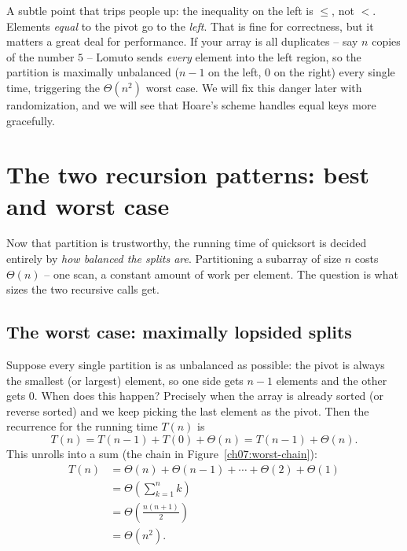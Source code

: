 \begin{trapbox}
A subtle point that trips people up: the inequality on the left is $\le$, not
$<$. Elements \emph{equal} to the pivot go to the \emph{left}. That is fine for
correctness, but it matters a great deal for performance. If your array is all
duplicates -- say $n$ copies of the number $5$ -- Lomuto sends \emph{every}
element into the left region, so the partition is maximally unbalanced ($n-1$ on
the left, $0$ on the right) every single time, triggering the $\Theta(n^2)$ worst case.
We will fix this danger later with randomization, and we will see that
Hoare's scheme handles equal keys more gracefully.
\end{trapbox}

\section{The two recursion patterns: best and worst case}

Now that partition is trustworthy, the running time of quicksort is decided
entirely by \emph{how balanced the splits are}. Partitioning a subarray of size
$n$ costs $\Theta(n)$ -- one scan, a constant amount of work per element. The
question is what sizes the two recursive calls get.

\subsection{The worst case: maximally lopsided splits}

Suppose every single partition is as unbalanced as possible: the pivot is always
the smallest (or largest) element, so one side gets $n-1$ elements and the other
gets $0$. When does this happen? Precisely when the array is already sorted (or
reverse sorted) and we keep picking the last element as the pivot. Then the
recurrence for the running time $T(n)$ is
\[
T(n) = T(n-1) + T(0) + \Theta(n) = T(n-1) + \Theta(n).
\]
This unrolls into a sum (the chain in Figure~\ref{ch07:worst-chain}):
\begin{align*}
T(n) &= \Theta(n) + \Theta(n-1) + \cdots + \Theta(2) + \Theta(1) \\
     &= \Theta\!\left(\sum_{k=1}^{n} k\right) \\
     &= \Theta\!\left(\frac{n(n+1)}{2}\right) \\
     &= \Theta(n^2).
\end{align*}

